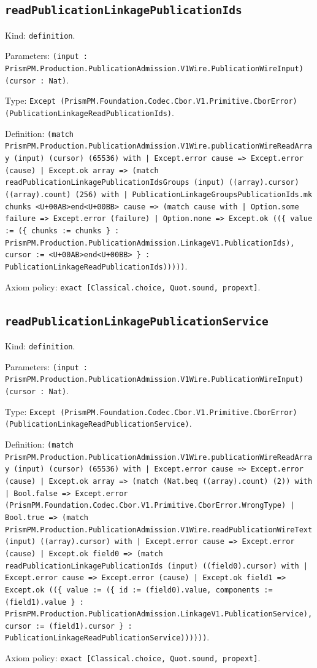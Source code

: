 \documentclass[11pt]{article}
\begin{document}
\subsection*{\texttt{readPublicationLinkagePublicationIds}}
\noindent Kind: \texttt{definition}.\par
\noindent Parameters: \texttt{(input : PrismPM.Production.PublicationAdmission.V1Wire.PublicationWireInput) (cursor : Nat)}.\par
\noindent Type: \texttt{Except (PrismPM.Foundation.Codec.Cbor.V1.Primitive.CborError) (PublicationLinkageReadPublicationIds)}.\par
\noindent Definition: \texttt{(match PrismPM.Production.PublicationAdmission.V1Wire.publicationWireReadArray (input) (cursor) (65536) with | Except.error cause => Except.error (cause) | Except.ok array => (match readPublicationLinkagePublicationIdsGroups (input) ((array).cursor) ((array).count) (256) with | PublicationLinkageGroupsPublicationIds.mk chunks <U+00AB>end<U+00BB> cause => (match cause with | Option.some failure => Except.error (failure) | Option.none => Except.ok ((\{ value := (\{ chunks := chunks \} : PrismPM.Production.PublicationAdmission.LinkageV1.PublicationIds), cursor := <U+00AB>end<U+00BB> \} : PublicationLinkageReadPublicationIds)))))}.\par
\noindent Axiom policy: \texttt{exact [Classical.choice, Quot.sound, propext]}.\par
\subsection*{\texttt{readPublicationLinkagePublicationService}}
\noindent Kind: \texttt{definition}.\par
\noindent Parameters: \texttt{(input : PrismPM.Production.PublicationAdmission.V1Wire.PublicationWireInput) (cursor : Nat)}.\par
\noindent Type: \texttt{Except (PrismPM.Foundation.Codec.Cbor.V1.Primitive.CborError) (PublicationLinkageReadPublicationService)}.\par
\noindent Definition: \texttt{(match PrismPM.Production.PublicationAdmission.V1Wire.publicationWireReadArray (input) (cursor) (65536) with | Except.error cause => Except.error (cause) | Except.ok array => (match (Nat.beq ((array).count) (2)) with | Bool.false => Except.error (PrismPM.Foundation.Codec.Cbor.V1.Primitive.CborError.WrongType) | Bool.true => (match PrismPM.Production.PublicationAdmission.V1Wire.readPublicationWireText (input) ((array).cursor) with | Except.error cause => Except.error (cause) | Except.ok field0 => (match readPublicationLinkagePublicationIds (input) ((field0).cursor) with | Except.error cause => Except.error (cause) | Except.ok field1 => Except.ok ((\{ value := (\{ id := (field0).value, components := (field1).value \} : PrismPM.Production.PublicationAdmission.LinkageV1.PublicationService), cursor := (field1).cursor \} : PublicationLinkageReadPublicationService))))))}.\par
\noindent Axiom policy: \texttt{exact [Classical.choice, Quot.sound, propext]}.\par
\end{document}
